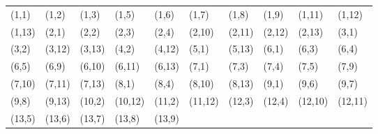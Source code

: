 \documentclass{article}
\begin{document}
\begin{tabular}{|*{10}{l}|}
\hline
(1,1) & (1,2) & (1,3) & (1,5) & (1,6) & (1,7) & (1,8) & (1,9) & (1,11) & (1,12) \\
(1,13) & (2,1) & (2,2) & (2,3) & (2,4) & (2,10) & (2,11) & (2,12) & (2,13) & (3,1) \\
(3,2) & (3,12) & (3,13) & (4,2) & (4,12) & (5,1) & (5,13) & (6,1) & (6,3) &
(6,4) \\
(6,5) & (6,9) & (6,10) & (6,11) & (6,13) & (7,1) & (7,3) & (7,4) & (7,5) & (7,9) \\
(7,10) & (7,11) & (7,13) & (8,1) & (8,4) & (8,10) & (8,13) & (9,1) & (9,6) &
(9,7) \\
(9,8) & (9,13) & (10,2) & (10,12) & (11,2) & (11,12) & (12,3) & (12,4) & (12,10) & (12,11) \\
(13,5) & (13,6) & (13,7) & (13,8) & (13,9) & & & & & \\
\hline
\end{tabular}

\vspace{1cm}

\end{document}
